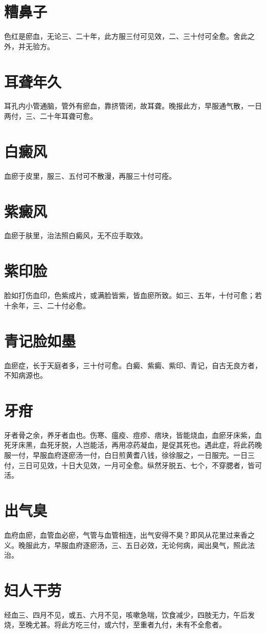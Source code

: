 \documentclass[a4paper,12pt,UTF8,twoside]{ctexbook}
\begin{document}
	\section{糟鼻子}
	色红是瘀血，无论三、二十年，此方服三付可见效，二、三十付可全愈。舍此之外，并无验方。
	
	\section{耳聋年久}
	耳孔内小管通脑，管外有瘀血，靠挤管闭，故耳聋。晚报此方，早服通气散，一日两付，三、二十年耳聋可愈。
	
	\section{白癜风}
	血瘀于皮里，服三、五付可不散漫，再服三十付可痊。
	\section{紫癜风}
	血瘀于肤里，治法照白癜风，无不应手取效。
	\section{紫印脸}
	脸如打伤血印，色紫成片，或满脸皆紫，皆血瘀所致。如三、五年，十付可愈；若十余年，三、二十付必愈。
	\section{青记脸如墨}
	血瘀症，长于天庭者多，三十付可愈。白癜、紫癜、紫印、青记，自古无良方者，不知病源也。
	\section{牙疳}
	牙者骨之余，养牙者血也。伤寒、瘟疫、痘疹、痞块，皆能烧血，血瘀牙床紫，血死牙床黑，血死牙脱，人岂能活，再用凉药凝血，是促其死也。遇此症，将此药晚服一付，早服血府逐瘀汤一付，白日煎黄耆八钱，徐徐服之，一日服完。一日三付，三日可见效，十日大见效，一月可全愈。纵然牙脱五、七个，不穿腮者，皆可活。
	
	\section{出气臭}
	血府血瘀，血管血必瘀，气管与血管相连，出气安得不臭？即风从花里过来香之义。晚服此方，早服血府逐瘀汤，三、五日必效，无论何病，闻出臭气，照此法治。
	\section{妇人干劳}
	经血三、四月不见，或五、六月不见，咳嗽急喘，饮食减少，四肢无力，午后发烧，至晚尤甚。将此方吃三付，或六忖，至重者九付，未有不全愈者。
\end{document}
